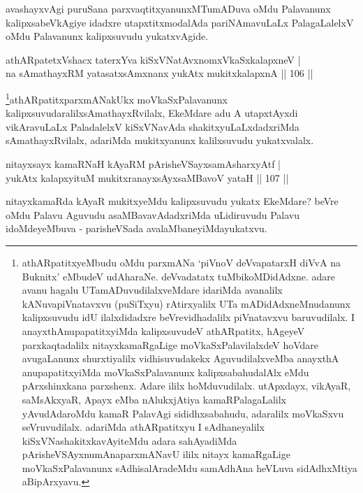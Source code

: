 \begin{artha}
avashayxvAgi puruSana parxvaqtitxyanunxMTumADuva oMdu Palavanunx kalipxsabeVkAgiye idadxre utapxtitxmodalAda pariNAmavuLaLx PalagaLalelxV oMdu Palavanunx kalipxsuvudu yukatxvAgide.
\end{artha}


\begin{shl}
athARpatetxVshacx taterxYva kiSxVNatAvxnomxVkaSxkalapxneV |\\
na sAmathayxRM yatasatxsAmxnanx yukAtx mukitxkalapxnA \hfill || 106 ||
\end{shl}

\begin{artha}
\footnote{athARpatitxyeMbudu oMdu parxmANa `piVnoV deVvapatarxH diVvA na Buknitx' eMbudeV udAharaNe. deVvadatatx tuMbikoMDidAdxne. adare avanu hagalu UTamADuvudilalxveMdare idariMda avanalilx kANuvapiVnatavxvu (puSiTxyu) rAtirxyalilx UTa mADidAdxneMnudanunx kalipxsuvudu idU ilalxdidadxre beVrevidhadalilx piVnatavxvu baruvudilalx. I anayxthAnupapatitxyiMda kalipxsuvudeV athARpatitx, hAgeyeV parxkaqtadalilx nitayxkamaRgaLige moVkaSxPalavilalxdeV hoVdare avugaLanunx shurxtiyalilx vidhisuvudakekx AguvudilalxveMba anayxthA anupapatitxyiMda moVkaSxPalavanunx kalipxsabahudalAlx eMdu pArxshinxkana parxshenx. Adare ililx hoMduvudilalx. utApxdayx, vikAyaR, saMsAkxyaR, Apayx eMba nAlukxjAtiya kamaRPalagaLalilx yAvudAdaroMdu kamaR PalavAgi sididhxsabahudu, adaralilx moVkaSxvu seVruvudilalx. adariMda athARpatitxyu I sAdhaneyalilx kiSxVNashakitxkavAyiteMdu adara sahAyadiMda pArisheVSAyxnumAnaparxmANavU ililx nitayx kamaRgaLige moVkaSxPalavanunx sAdhisalAradeMdu samAdhAna heVLuva sidAdhxMtiya aBipArxyavu.}athARpatitxparxmANakUkx moVkaSxPalavanunx kalipxsuvudaralilx\break sAmathayxRvilalx, EkeMdare adu A utapxtAyxdi vikAravuLaLx PaladalelxV kiSxVNavAda shakitxyuLaLxdadxriMda sAmathayxRvilalx, adariMda mukitxyanunx kalilxsuvudu yukatxvalalx.
\end{artha}


\begin{shl}
nitayxsayx kamaRNaH kAyaRM pArisheVSayxsamAsharxyAtf |\\
yukAtx kalapxyituM mukitxranayxsAyxsaMBavoV yataH \hfill || 107 ||
\end{shl}

\begin{artha}
nitayxkamaRda kAyaR mukitxyeMdu kalipxsuvudu yukatx EkeMdare? beVre oMdu Palavu Aguvudu asaMBavavAdadxriMda uLidiruvudu Palavu idoMdeyeMbuva - parisheVSada avalaMbaneyiMda\break yukatxvu.
\end{artha}

